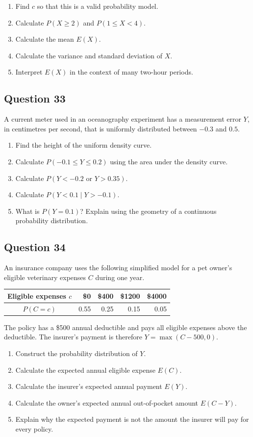 \documentclass[10pt,letterpaper]{article}
\newcommand{\questionheading}[1]{%
  \subsection*{Question #1}
}
\begin{document}
\begin{enumerate}
\item Find $c$ so that this is a valid probability model.
\item Calculate $P(X\geq2)$ and $P(1\leq X<4)$.
\item Calculate the mean $E(X)$.
\item Calculate the variance and standard deviation of $X$.
\item Interpret $E(X)$ in the context of many two-hour periods.
\end{enumerate}

\newpage

\questionheading{33}
A current meter used in an oceanography experiment has a measurement error $Y$, in centimetres per second, that is uniformly distributed between $-0.3$ and $0.5$.
\begin{enumerate}
	\item Find the height of the uniform density curve.
	\item Calculate $P(-0.1\leq Y\leq0.2)$ using the area under the density curve.
	\item Calculate $P(Y<-0.2\text{ or }Y>0.35)$.
	\item Calculate $P(Y<0.1\mid Y>-0.1)$.
	\item What is $P(Y=0.1)$? Explain using the geometry of a continuous probability distribution.
\end{enumerate}

\questionheading{34}
An insurance company uses the following simplified model for a pet owner's eligible veterinary expenses $C$ during one year.
\begin{center}
\begin{tabular}{c*{4}{r}}
\toprule
Eligible expenses $c$ & \$0 & \$400 & \$1200 & \$4000 \\
\midrule
$P(C=c)$ & 0.55 & 0.25 & 0.15 & 0.05 \\
\bottomrule
\end{tabular}
\end{center}

The policy has a \$500 annual deductible and pays all eligible expenses above the deductible. The insurer's payment is therefore $Y=\max(C-500,0)$.
\begin{enumerate}
	\item Construct the probability distribution of $Y$.
	\item Calculate the expected annual eligible expense $E(C)$.
	\item Calculate the insurer's expected annual payment $E(Y)$.
	\item Calculate the owner's expected annual out-of-pocket amount $E(C-Y)$.
	\item Explain why the expected payment is not the amount the insurer will pay for every policy.
\end{enumerate}
\end{document}
